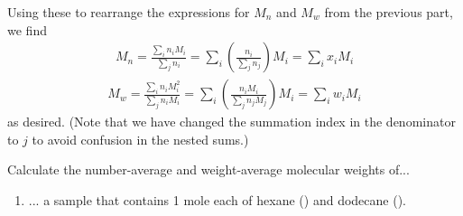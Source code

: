 \begin{activity}
\begin{exercises}
\begin{enumerate}
\begin{solution}
{						Using these to rearrange the expressions for $M_n$ and $M_w$ from the previous part, we find
	\begin{align*}
		M_n = \frac{\sum_i  n_i M_i}{\sum_j n_i}
			= \sum_i \left(\frac{n_i}{\sum_j n_j}\right) M_i
			= \sum_i x_i M_i
	\end{align*}
	\begin{align*}
		M_w = \frac{\sum_i n_i M_i^2 }{\sum_j n_i M_i}
			= \sum_i \left(\frac{n_i M_i}{\sum_j n_j M_j}\right) M_i
			= \sum_i w_i M_i
	\end{align*}
	as desired.  (Note that we have changed the summation index in the denominator to $j$ to avoid confusion in the nested sums.)
						
					}\end{solution}
				
			\end{enumerate}
			
		\exercise Calculate the number-average and weight-average molecular weights of...
		
			\begin{enumerate}
			
				\item ... a sample that contains 1 mole each of hexane () and dodecane ().
					
					\begin{solution}\end{solution}
				

\end{enumerate}
\end{exercises}
\end{activity}
